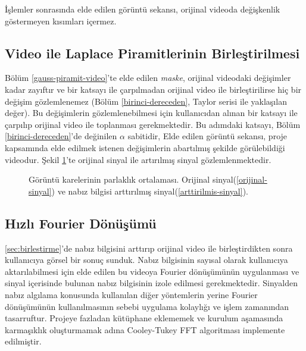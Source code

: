 \documentclass[a4paper, 12pt]{article}
\begin{document}
İşlemler sonrasında elde edilen görüntü sekansı, orijinal videoda değişkenlik göstermeyen kısımları içermez. 



\subsection{Video ile Laplace Piramitlerinin Birleştirilmesi}{\label{sec:birlestirme}}

Bölüm \ref{gauss-piramit-video}'te elde edilen \textit{maske}, orijinal videodaki değişimler kadar zayıftır ve bir katsayı ile çarpılmadan orijinal video ile birleştirilirse hiç bir değişim gözlemlenemez (Bölüm \ref{birinci-dereceden}, Taylor serisi ile yaklaşılan değer). Bu değişimlerin gözlemlenebilmesi için kullanıcıdan alınan bir katsayı ile çarpılıp orijinal video ile toplanması gerekmektedir. Bu adımdaki katsayı, Bölüm \ref{birinci-dereceden}'de değinilen $\alpha$ sabitidir, Elde edilen görüntü sekansı, proje kapsamında elde edilmek istenen değişimlerin abartılmış şekilde görülebildiği videodur. Şekil \ref{sonuc-ort}'te orijinal sinyal ile artırılmış sinyal gözlemlenmektedir.


\begin{figure}[h]
\centering
{}
	\caption{Görüntü karelerinin parlaklık ortalaması. Orijinal sinyal(\ref{orijinal-sinyal}) ve nabız bilgisi arttırılmış sinyal(\ref{arttirilmis-sinyal}). } 
\label{sonuc-ort}
\end{figure}

\vspace{-1cm}

\subsection{Hızlı Fourier Dönüşümü}



\ref{sec:birlestirme}'de nabız bilgisini arttırıp orijinal video ile birleştirdikten sonra kullanıcıya görsel bir sonuç sunduk. Nabız bilgisinin sayısal olarak kullanıcıya aktarılabilmesi için elde edilen bu videoya Fourier dönüşümünün uygulanması ve sinyal içerisinde bulunan nabız bilgisinin izole edilmesi gerekmektedir. Sinyalden nabız algılama konusunda kullanılan diğer yöntemlerin yerine Fourier dönüşümünün kullanılmasının sebebi uygulama kolaylığı ve işlem zamanından tasarruftur. Projeye fazladan kütüphane eklememek ve kurulum aşamasında karmaşıklık oluşturmamak adına Cooley-Tukey FFT algoritması implemente edilmiştir. 
\end{document}
